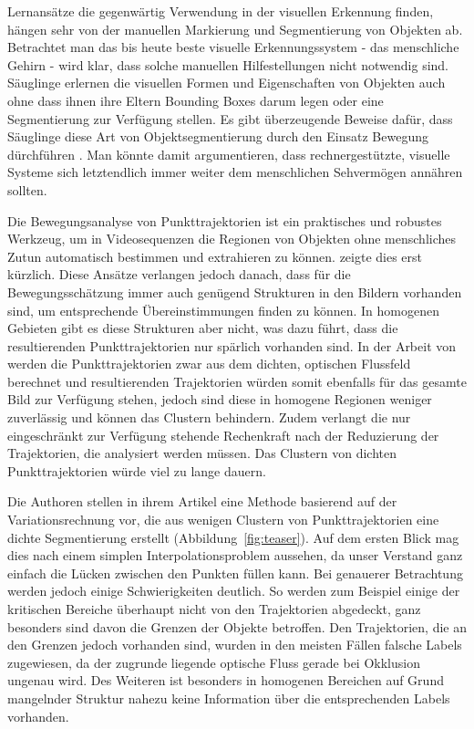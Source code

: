 Lernansätze die gegenwärtig Verwendung in der visuellen Erkennung finden, hängen sehr von der manuellen Markierung und Segmentierung von Objekten ab.
Betrachtet man das bis heute beste visuelle Erkennungssystem - das menschliche Gehirn - wird klar,
dass solche manuellen Hilfestellungen nicht notwendig sind. Säuglinge erlernen die visuellen Formen und
Eigenschaften von Objekten auch ohne dass ihnen ihre Eltern Bounding Boxes darum legen oder eine Segmentierung zur Verfügung stellen.
Es gibt überzeugende Beweise dafür, dass Säuglinge diese Art von Objektsegmentierung durch den Einsatz Bewegung dürchführen \cite{022,017}.
Man könnte damit argumentieren, dass rechnergestützte, visuelle Systeme sich letztendlich immer weiter dem menschlichen Sehvermögen annähren sollten.

Die Bewegungsanalyse von Punkttrajektorien ist ein praktisches und robustes Werkzeug, um in Videosequenzen die Regionen von Objekten ohne
menschliches Zutun automatisch bestimmen und extrahieren zu können. \cite{020,007} zeigte dies erst kürzlich.
Diese Ansätze verlangen jedoch danach, dass für die Bewegungsschätzung immer auch genügend Strukturen in den Bildern vorhanden sind,
um entsprechende Übereinstimmungen finden zu können.
In homogenen Gebieten gibt es diese Strukturen aber nicht, was dazu führt, dass die resultierenden Punkttrajektorien nur spärlich vorhanden sind.
In der Arbeit von \cite{007} werden die Punkttrajektorien zwar aus dem dichten, optischen Flussfeld berechnet und resultierenden Trajektorien würden
somit ebenfalls für das gesamte Bild zur Verfügung stehen, jedoch sind diese in homogene Regionen weniger zuverlässig und können das Clustern behindern.
Zudem verlangt die nur eingeschränkt zur Verfügung stehende Rechenkraft nach der Reduzierung der Trajektorien, die analysiert werden müssen.
Das Clustern von dichten Punkttrajektorien würde viel zu lange dauern.

Die Authoren stellen in ihrem Artikel eine Methode basierend auf der Variationsrechnung vor,
die aus wenigen Clustern von Punkttrajektorien eine dichte Segmentierung erstellt (Abbildung~\ref{fig:teaser}).
Auf dem ersten Blick mag dies nach einem simplen Interpolationsproblem aussehen, da unser Verstand ganz einfach die Lücken zwischen den Punkten füllen kann.
Bei genauerer Betrachtung werden jedoch einige Schwierigkeiten deutlich.
So werden zum Beispiel einige der kritischen Bereiche überhaupt nicht von den Trajektorien abgedeckt,
ganz besonders sind davon die Grenzen der Objekte betroffen. Den Trajektorien, die an den Grenzen jedoch vorhanden sind,
wurden in den meisten Fällen falsche Labels zugewiesen, da der zugrunde liegende optische Fluss gerade bei Okklusion ungenau wird.
Des Weiteren ist besonders in homogenen Bereichen auf Grund mangelnder Struktur nahezu keine Information über die entsprechenden Labels vorhanden.

